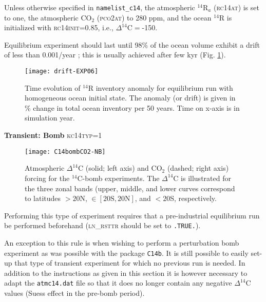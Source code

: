 \documentclass[../main/TOP_manual]{subfiles}
\newcommand{\cd}{\mathrm{CO_2}}
\newcommand{\cq}{\mathrm{^{14}C}}
\newcommand{\Dcq}{\Delta ^{14}\mathrm{C}}
\newcommand{\Rq}{\mathrm{^{14}{R}}}
\newcommand{\CODE}[1]{\textsc{#1}}
\begin{document}
Unless otherwise specified in \texttt{namelist\_c14}, the atmospheric $\Rq_a$ (\CODE{rc14at}) is set to one, the atmospheric $\cd$ (\CODE{pco2at}) to 280 ppm, and the ocean $\Rq$ is initialized with \CODE{rc14init=0.85}, i.e., $\Dcq=$-150\textperthousand  \cite[typical for deep-ocean, Fig 6 in][]{key_2004}.

Equilibrium experiment should last until 98\% of the ocean volume exhibit a drift of less than 0.001\textperthousand/year \citep{orr_2000}; this is usually achieved after few kyr (Fig. \ref{fig:drift}).
%
\begin{figure}[!h]
\begin{center}
\texttt{[image: drift-EXP06]}
\end{center}
\vspace{-4ex}
\caption{ Time evolution of $\Rq$ inventory anomaly for equilibrium run with homogeneous ocean initial state. The anomaly (or drift) is given in \%  change in total ocean inventory per 50 years. Time on x-axis is in simulation year.\label{fig:drift} }
\end{figure}

\textbf{Transient: Bomb}
\label{sec:bomb}
\CODE{kc14typ}=1

\begin{figure}[!h]
\begin{center}
\texttt{[image: C14bombCO2-NB]}
\end{center}
\vspace{-4ex}
\caption{Atmospheric $\Dcq$ (solid; left axis) and $\cd$ (dashed; right axis)  forcing for the $\cq$-bomb experiments. The $\Dcq$ is illustrated for the three zonal bands (upper, middle, and lower curves correspond to latitudes $> 20$N, $\in [20\mathrm{S},20\mathrm{N}]$, and $< 20$S, respectively.} \label{fig:bomb}
\end{figure}

Performing this type of experiment requires that a pre-industrial equilibrium run be performed beforehand (\CODE{ln\_rsttr} should be set to \texttt{.TRUE.}).

An exception to this rule is when wishing to perform a perturbation bomb experiment as was possible with the package \texttt{C14b}. It is still possible to easily set-up that type of transient experiment for which no previous run is needed.  In addition to the instructions as given in this section it is however necessary to adapt the \texttt{atmc14.dat} file so that it does no longer contain any negative $\Dcq$ values (Suess effect in the pre-bomb period).
\end{document}
